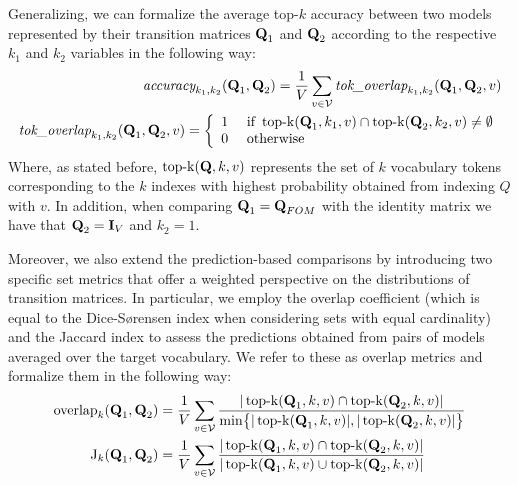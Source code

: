 Generalizing, we can formalize the average top-$k$ accuracy between two models represented by their transition matrices $\bm{\mathbf{Q}}_1$ and $\bm{\mathbf{Q}}_2$ according to the respective $k_1$ and $k_2$ variables in the following way:
\begin{equation}
    \label{eq:method_fom_topk}
    \begin{aligned}
    \textit{accuracy}_{k_1,k_2}(\bm{\mathbf{Q}}_1, \bm{\mathbf{Q}}_2) = \frac{1}{V} \sum_{v \in \mathcal{V}}{\textit{tok\_overlap}_{k_1,k_2}(\bm{\mathbf{Q}}_1, \bm{\mathbf{Q}}_2, v)} \\
    \textit{tok\_overlap}_{k_1,k_2}(\bm{\mathbf{Q}}_1, \bm{\mathbf{Q}}_2, v) = \left\{
        \begin{array}{cl}
            1 &\ \text{if}\ \operatorname{top-k}(\bm{\mathbf{Q}}_1, k_1, v) \cap \operatorname{top-k}(\bm{\mathbf{Q}}_2, k_2, v) \neq \emptyset \\
            0 &\ \text{otherwise}
        \end{array}
        \right.
    \end{aligned}
\end{equation}
Where, as stated before, $\operatorname{top-k}(\bm{\mathbf{Q}}, k, v)$ represents the set of $k$ vocabulary tokens corresponding to the $k$ indexes with highest probability obtained from indexing $Q$ with $v$.
In addition, when comparing $\bm{\mathbf{Q}}_1 = \bm{\mathbf{Q}}_{FOM}$ with the identity matrix we have that $\bm{\mathbf{Q}}_2 = \bm{\mathbf{I}}_V$ and $k_2 = 1$.

Moreover, we also extend the prediction-based comparisons by introducing two specific set metrics that offer a weighted perspective on the distributions of transition matrices.
In particular, we employ the overlap coefficient (which is equal to the Dice-S\o{}rensen index when considering sets with equal cardinality) and the Jaccard index to assess the predictions obtained from pairs of models averaged over the target vocabulary.
We refer to these as overlap metrics and formalize them in the following way:
\begin{equation}
    \label{eq:method_fom_overlap}
    \begin{aligned}
        \operatorname{overlap}_k(\gbm{Q}_1, \gbm{Q}_2) &= \frac{1}{V}\sum_{v \in \mathcal{V}}{\frac{|\operatorname{top-k}(\gbm{Q}_1, k, v) \cap \operatorname{top-k}(\gbm{Q}_2, k, v)|}{\operatornamewithlimits{min}\bigl\{|\operatorname{top-k}(\gbm{Q}_1, k, v)|, |\operatorname{top-k}(\gbm{Q}_2, k, v)|\bigr\}}} \\
        \operatorname{J}_k(\gbm{Q}_1, \gbm{Q}_2) &= \frac{1}{V}\sum_{v \in \mathcal{V}}{\frac{|\operatorname{top-k}(\gbm{Q}_1, k, v) \cap \operatorname{top-k}(\gbm{Q}_2, k, v)|}{|\operatorname{top-k}(\gbm{Q}_1, k, v) \cup \operatorname{top-k}(\gbm{Q}_2, k, v)|}} \\
    \end{aligned}
\end{equation}

